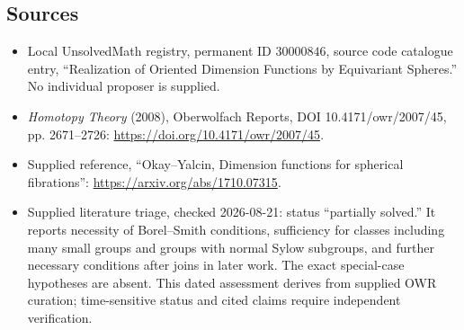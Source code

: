 \documentclass[11pt]{article}
\begin{document}
\subsection{Sources}
\begin{itemize}
\item Local UnsolvedMath registry, permanent ID \(30000846\), source code catalogue entry, ``Realization of Oriented Dimension Functions by Equivariant Spheres.'' No individual proposer is supplied.
\item \emph{Homotopy Theory} (2008), Oberwolfach Reports, DOI 10.4171/owr/2007/45, pp. 2671--2726: \url{https://doi.org/10.4171/owr/2007/45}.
\item Supplied reference, ``Okay--Yalcin, Dimension functions for spherical fibrations'': \url{https://arxiv.org/abs/1710.07315}.
\item Supplied literature triage, checked 2026-08-21: status ``partially solved.'' It reports necessity of Borel--Smith conditions, sufficiency for classes including many small groups and groups with normal Sylow subgroups, and further necessary conditions after joins in later work. The exact special-case hypotheses are absent. This dated assessment derives from supplied OWR curation; time-sensitive status and cited claims require independent verification.
\end{itemize}
\end{document}
